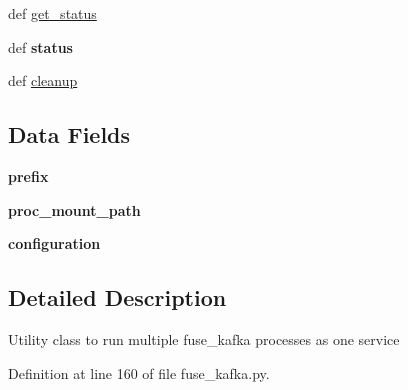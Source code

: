 \begin{DoxyCompactItemize}
\item 
def \hyperlink{classfuse__kafka_1_1FuseKafkaService_a6e9278183d970e683d7060610bb9bc6f}{get\-\_\-status}
\item 
\hypertarget{classfuse__kafka_1_1FuseKafkaService_a0289d64b6f56aef8b710466042ada3d1}{def {\bfseries status}}\label{classfuse__kafka_1_1FuseKafkaService_a0289d64b6f56aef8b710466042ada3d1}

\item 
def \hyperlink{classfuse__kafka_1_1FuseKafkaService_a9cf98c6a35fb986e6877dfdca61630c0}{cleanup}
\end{DoxyCompactItemize}
\subsection*{\-Data \-Fields}
\begin{DoxyCompactItemize}
\item 
\hypertarget{classfuse__kafka_1_1FuseKafkaService_ae104081d0b1ec3c4c44cfd4ccf75b01e}{{\bfseries prefix}}\label{classfuse__kafka_1_1FuseKafkaService_ae104081d0b1ec3c4c44cfd4ccf75b01e}

\item 
\hypertarget{classfuse__kafka_1_1FuseKafkaService_a1238f08c265e4c19a8a721f57bd7dafe}{{\bfseries proc\-\_\-mount\-\_\-path}}\label{classfuse__kafka_1_1FuseKafkaService_a1238f08c265e4c19a8a721f57bd7dafe}

\item 
\hypertarget{classfuse__kafka_1_1FuseKafkaService_afd89f62981d0dcbb3efee6f56c949642}{{\bfseries configuration}}\label{classfuse__kafka_1_1FuseKafkaService_afd89f62981d0dcbb3efee6f56c949642}

\end{DoxyCompactItemize}


\subsection{\-Detailed \-Description}
\begin{DoxyVerb}Utility class to run multiple fuse_kafka processes as one service \end{DoxyVerb}
 

\-Definition at line 160 of file fuse\-\_\-kafka.\-py.



